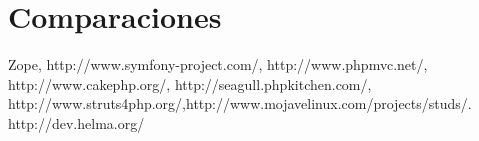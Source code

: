 \section{Comparaciones}
Zope, http://www.symfony-project.com/, http://www.phpmvc.net/, http://www.cakephp.org/, http://seagull.phpkitchen.com/, http://www.struts4php.org/,http://www.mojavelinux.com/projects/studs/. http://dev.helma.org/